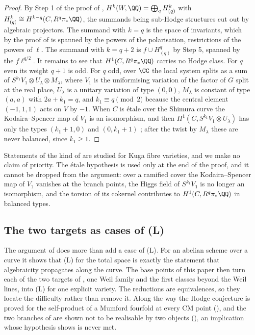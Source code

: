 \begin{proof}
By Step 1 of the proof of ,
$H^{k}(W,\QQ)=\bigoplus_{q}H^{k}_{(q)}$ with $H^{k}_{(q)}\cong
H^{k-q}(C,R^{q}\pi_{*}\QQ)$, the summands being sub-Hodge structures cut out by
algebraic projectors. The summand with $k=q$ is the space of invariants, which
by the proof of  is spanned by the powers of the
polarisation, restrictions of the powers of $\ell$. The summand with $k=q+2$
is $f\cup H^{q}_{(q)}$ by Step 5, spanned by the $f\ell^{q/2}$. It remains to
see that $H^{1}(C,R^{q}\pi_{*}\QQ)$ carries no Hodge class. For $q$ even its
weight $q+1$ is odd. For $q$ odd, over $\CC$ the local system splits as a sum
of $S^{k_{1}}V_{1}\otimes U_{\lambda}\otimes M_{\lambda}$, where $V_{1}$ is the
uniformising variation of the factor of $G$ split at the real place, $U_{\lambda}$ is
a unitary variation of type $(0,0)$, $M_{\lambda}$ is constant of type $(a,a)$
with $2a+k_{1}=q$, and $k_{1}\equiv q\pmod2$ because the central element
$(-1,1,1)$ acts on $V$ by $-1$. When $C$ is \'etale over the Shimura curve the
Kodaira--Spencer map of $V_{1}$ is an isomorphism, and then
$H^{1}(C,S^{k_{1}}V_{1}\otimes U_{\lambda})$ has only the types $(k_{1}+1,0)$
and $(0,k_{1}+1)$ \cite{Zuc79}; after the twist by $M_{\lambda}$ these are
never balanced, since $k_{1}\ge1$.
\end{proof}

Statements of the kind of  are studied for Kuga
fibre varieties, and we make no claim of priority.
The \'etale hypothesis is used only at the end of the proof, and it cannot be
dropped from the argument: over a ramified cover the Kodaira--Spencer map of
$V_{1}$ vanishes at the branch points, the Higgs field of $S^{k_{1}}V_{1}$ is
no longer an isomorphism, and the torsion of its cokernel contributes to
$H^{1}(C,R^{q}\pi_{*}\QQ)$ in balanced types.

\subsection{The two targets as cases of (L)}
\label{ssec:targets}

The argument of  does more than add a case of
\textup{(L)}. For an abelian scheme over a curve it shows that \textup{(L)}
for the total space is exactly the statement that algebraicity propagates
along the curve. The base points of this paper then turn each of the two
targets of , one Weil family and the first
classes beyond the Weil lines, into \textup{(L)} for one explicit variety. The
reductions are equivalences, so they locate the difficulty rather than remove
it. Along the way the Hodge conjecture is proved for the self-product of a
Mumford fourfold at every CM point (), and the two
branches of \cite[Remark~2.10]{paperII} are shown not to be realisable by two
objects (), an implication whose hypothesis
\cite[Theorem~3.5]{paperII} shows is never met.

